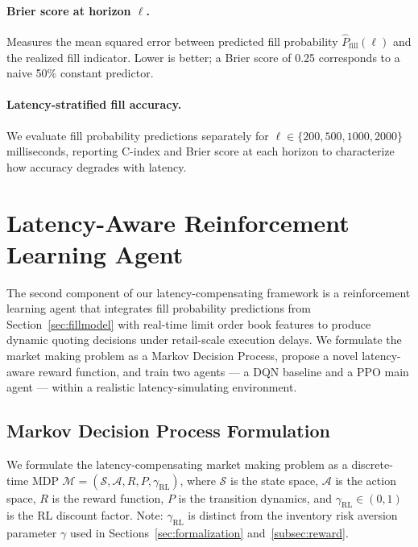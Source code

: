 \documentclass[12pt]{article}
\newcommand{\pfill}{\hat{P}_{\mathrm{fill}}}
\begin{document}
\paragraph{Brier score at horizon $\ell$.} Measures the mean squared error between predicted fill probability $\pfill(\ell)$ and the realized fill indicator. Lower is better; a Brier score of 0.25 corresponds to a naive 50\% constant predictor.

\paragraph{Latency-stratified fill accuracy.} We evaluate fill probability predictions separately for $\ell \in \{200, 500, 1000, 2000\}$ milliseconds, reporting C-index and Brier score at each horizon to characterize how accuracy degrades with latency.

\section{Latency-Aware Reinforcement Learning Agent}
\label{sec:rl}

The second component of our latency-compensating framework is a reinforcement learning agent that integrates fill probability predictions from Section~\ref{sec:fillmodel} with real-time limit order book features to produce dynamic quoting decisions under retail-scale execution delays. We formulate the market making problem as a Markov Decision Process, propose a novel latency-aware reward function, and train two agents --- a DQN baseline and a PPO main agent --- within a realistic latency-simulating environment.

\subsection{Markov Decision Process Formulation}

We formulate the latency-compensating market making problem as a discrete-time MDP $\mathcal{M} = (\mathcal{S}, \mathcal{A}, R, P, \gamma_{\mathrm{RL}})$, where $\mathcal{S}$ is the state space, $\mathcal{A}$ is the action space, $R$ is the reward function, $P$ is the transition dynamics, and $\gamma_{\mathrm{RL}} \in (0,1)$ is the RL discount factor. Note: $\gamma_{\mathrm{RL}}$ is distinct from the inventory risk aversion parameter $\gamma$ used in Sections~\ref{sec:formalization} and~\ref{subsec:reward}.
\end{document}
